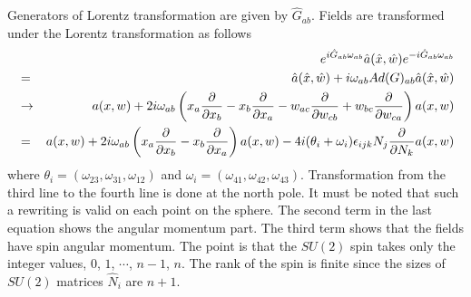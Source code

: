 \documentclass[a4paper,11pt]{article}
\begin{document}
Generators of Lorentz transformation are given by 
$\hat{G}_{ab}$. Fields are transformed under the Lorentz 
transformation as follows 
\begin{eqnarray}
&&e^{i\hat{G}_{ab}\omega_{ab}}\hat{a}(\hat{x},\hat{w})
e^{-i\hat{G}_{ab}\omega_{ab}} \cr 
&=&\hat{a}(\hat{x},\hat{w})
+i\omega_{ab}Ad(G)_{ab}\hat{a}(\hat{x},\hat{w}) \cr 
&\rightarrow &a(x,w) 
+2i\omega_{ab}\left(
x_{a}\frac{\partial}{\partial x_{b}}
-x_{b}\frac{\partial}{\partial x_{a}}
-w_{ac}\frac{\partial}{\partial w_{cb}}
+w_{bc}\frac{\partial}{\partial w_{ca}}
\right)a(x,w)  \cr 
&=&
a(x,w) 
+2i\omega_{ab}\left(
x_{a}\frac{\partial}{\partial x_{b}}
-x_{b}\frac{\partial}{\partial x_{a}} \right)
a(x,w)
-4i(\theta_{i}+\omega_{i})
\epsilon_{ijk}N_{j}\frac{\partial}{\partial N_{k}}
a(x,w)
\label{lorentztrans}
\end{eqnarray}
where $\theta_{i}=(\omega_{23},\omega_{31},\omega_{12})$ 
and $\omega_{i}=(\omega_{41},\omega_{42},\omega_{43})$.
Transformation from the third line to the fourth line 
is done at the north pole. It must be noted that 
such a rewriting is valid on each point on the sphere. 
The second term in the last equation 
shows the angular momentum part. 
The third term shows that the fields 
have spin angular momentum. 
The point is that the $SU(2)$ spin takes 
only the integer values, 
$0$, $1$, $\cdots$, $n-1$, $n$. 
The rank of the spin is finite 
since the sizes of $SU(2)$ matrices $\hat{N}_{i}$ 
are $n+1$. 
\end{document}
